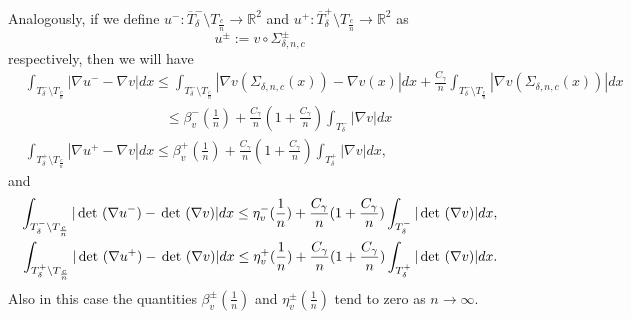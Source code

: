 \documentclass[a4paper,11pt]{article}
\numberwithin{equation}{section}
\def\det{\,{\rm det\ }}
\newcommand{\R}{\mathbb{R}}
\begin{document}
%
%
%

%
%



Analogously, if we define $u^-:\overline T_\delta^-\setminus T_{\frac cn}\rightarrow \R^2$ and $u^+:\overline T_\delta^+\setminus T_{\frac cn}\rightarrow \R^2$ as $$  u^\pm:=v\circ \Sigma^\pm_{\delta,n,c}$$
respectively, 
then we will have 
\begin{align}\label{grad_inTdelta}
	&\int_{T^-_\delta\setminus T_{\frac cn}}|\nabla u^--\nabla v|dx\leq  \int_{T^-_\delta\setminus T_{\frac cn}}|\nabla v(\Sigma_{\delta,n,c}(x))-\nabla v(x)|dx +\frac {C_\gamma}{n}\int_{T^-_\delta\setminus T_{\frac cn}}|\nabla v(\Sigma_{\delta,n,c}(x))|dx\nonumber\\
	&\qquad\qquad\qquad\qquad\qquad \leq  \beta^-_v(\frac1n)+\frac {C_\gamma}{n}(1+ \frac {C_\gamma}{n})\int_{T_\delta^-} |\nabla v|dx\nonumber\\
	&\int_{T^+_\delta\setminus T_{\frac cn}}|\nabla u^+-\nabla v|dx\leq \beta^+_v(\frac1n)+\frac {C_\gamma}{n}(1+ \frac {C_\gamma}{n})\int_{T_\delta^+} |\nabla v|dx,
\end{align}
and
\begin{align}\label{det_inTdelta}
	\int_{T^-_\delta\setminus T_{\frac cn}}|\det(\nabla u^-)-\det(\nabla v)|dx\leq \eta^-_v(\frac1n)+\frac {C_\gamma}{n}(1+ \frac {C_\gamma}{n})\int_{T_\delta^-}|\det(\nabla v)|dx,\nonumber\\
	\int_{T^+_\delta\setminus T_{\frac cn}}|\det(\nabla u^+)-\det(\nabla v)|dx\leq \eta^+_v(\frac1n)+\frac {C_\gamma}{n}(1+ \frac {C_\gamma}{n})\int_{T_\delta^+}|\det(\nabla v)|dx.
\end{align}
Also in this case the quantities $\beta^\pm_v(\frac1n)$ and $\eta^\pm_v(\frac1n)$ tend to zero  as $n\rightarrow \infty$.
\end{document}
